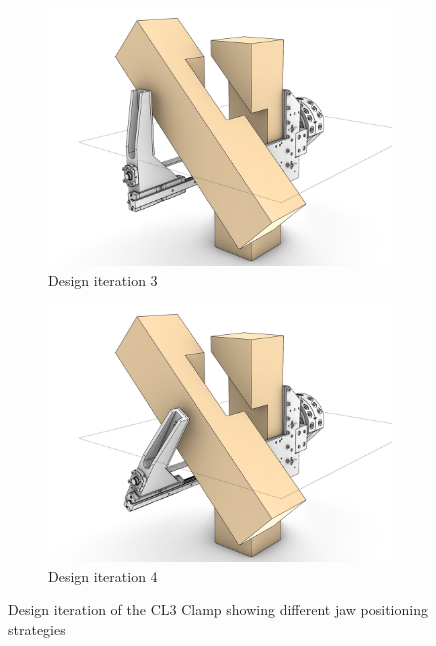 \begin{figure}
\begin{subfigure}[b]{0.49\textwidth}
        \centering
        \includegraphics[width=\textwidth]{images/05/cl2-iteration-3.jpg}
        \caption{Design iteration 3}
        \label{fig:cl3-design-step-3}
    \end{subfigure}
    \hfill
    \begin{subfigure}[b]{0.49\textwidth}
        \centering
        \includegraphics[width=\textwidth]{images/05/cl2-iteration-4.jpg}
        \caption{Design iteration 4}
        \label{fig:cl3-design-step-4}
    \end{subfigure}
    \caption[Design iteration of the CL3 Clamp]
    {Design iteration of the CL3 Clamp showing different jaw positioning strategies}
    \label{fig:cl3-design-steps}
\end{figure}

